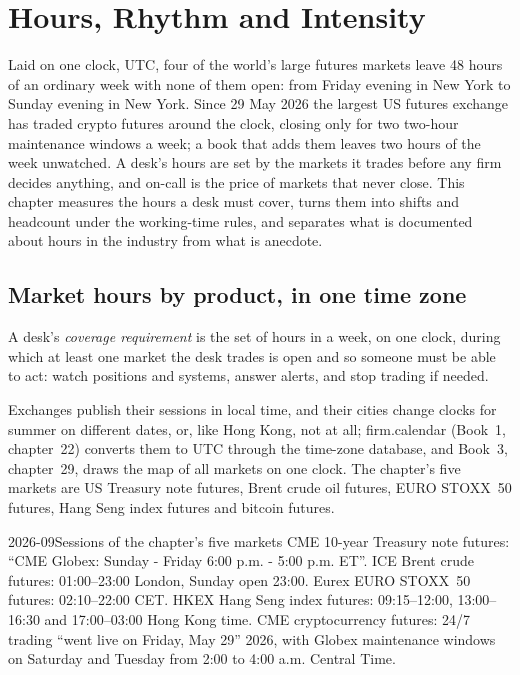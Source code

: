 \chapter{Hours, Rhythm and Intensity}\label{ch:in:hours-rhythm-and-intensity}

Laid on one clock, UTC, four of the world's large futures markets leave 48 hours of an ordinary week with none of them
open: from Friday evening in New York to Sunday evening in New York. Since 29 May 2026 the largest US futures exchange
has traded crypto futures around the clock, closing only for two two-hour maintenance windows a week; a book that adds
them leaves two hours of the week unwatched. A desk's hours are set by the markets it trades before any firm decides
anything, and on-call is the price of markets that never close. This chapter measures the hours a desk must cover, turns
them into shifts and headcount under the working-time rules, and separates what is documented about hours in the
industry from what is anecdote.

\section{Market hours by product, in one time zone}

\begin{definition}\label{def:in:hours-rhythm-and-intensity:coverage}
A desk's \emph{coverage requirement} is the set of hours in a week, on one clock, during
which at least one market the desk trades is open and so someone must be able to act: watch positions and systems,
answer alerts, and stop trading if needed.
\end{definition}

Exchanges publish their sessions in local time, and their cities change clocks for summer on different dates, or, like
Hong Kong, not at all; firm.calendar (Book~1, chapter~22) converts them to UTC through the time-zone database, and Book~3,
chapter~29, draws the map of all markets on one clock. The chapter's five markets are US Treasury note futures, Brent
crude oil futures, EURO STOXX~50 futures, Hang Seng index futures and bitcoin futures.

\begin{dated}{2026-09}{Sessions of the chapter's five markets}\label{dat:in:hours-rhythm-and-intensity:sessions}
CME 10-year Treasury note futures: ``CME Globex: Sunday - Friday 6:00 p.m. - 5:00 p.m. ET''. ICE Brent crude futures:
01:00--23:00 London, Sunday open 23:00. Eurex EURO STOXX~50 futures: 02:10--22:00 CET. HKEX Hang Seng index futures:
09:15--12:00, 13:00--16:30 and 17:00--03:00 Hong Kong time. CME cryptocurrency futures: 24/7 trading ``went live on
Friday, May 29'' 2026, with Globex maintenance windows on Saturday and Tuesday from 2:00 to 4:00 a.m. Central Time.
\end{dated}


